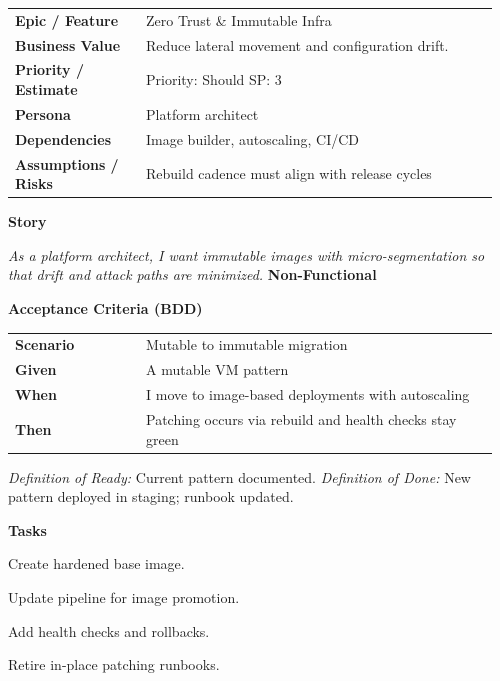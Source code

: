 \documentclass[11pt,letterpaper]{article}
\makeatletter
\newenvironment{kvtable}{%
  \begin{tabular}{@{}>{\bfseries\arraybackslash}p{0.26\linewidth} p{0.70\linewidth}@{}}
}{\end{tabular}}
\newenvironment{bdd}{%
  \begin{tabular}{@{}>{\bfseries\arraybackslash}p{0.26\linewidth} p{0.70\linewidth}@{}}
}{\end{tabular}}
\newcommand{\DoRDoD}[2]{%
  \vspace{0.35em}
  {\footnotesize\color{Muted}%
    \textit{Definition of Ready:} #1 \; \textbullet\;
    \textit{Definition of Done:} #2%
  }%
}
\newenvironment{storycard}[2]{%
  \begin{tcolorbox}[cloudcard, title={#1 --- #2}]%
}{\end{tcolorbox}}
\newcommand{\sectionlabel}[1]{\vspace{0.35em}\textbf{#1}\par}
\makeatother
\begin{document}
\begin{storycard}{CCS-15}{Ch. 15 — Architecture \& Security Concepts}
\begin{kvtable}
Epic / Feature & Zero Trust \& Immutable Infra\\
Business Value & Reduce lateral movement and configuration drift.\\
Priority / Estimate & Priority: Should \quad SP: 3\\
Persona & Platform architect\\
Dependencies & Image builder, autoscaling, CI/CD\\
Assumptions / Risks & Rebuild cadence must align with release cycles\\
\end{kvtable}
\sectionlabel{Story}
\textit{As a platform architect, I want immutable images with micro-segmentation so that drift and attack paths are minimized.}
\sectionlabel{Non-Functional}\;
\sectionlabel{Acceptance Criteria (BDD)}
\begin{bdd}
Scenario & Mutable to immutable migration\\
Given & A mutable VM pattern\\
When & I move to image-based deployments with autoscaling\\
Then & Patching occurs via rebuild and health checks stay green\\
\end{bdd}
\DoRDoD{Current pattern documented.}{New pattern deployed in staging; runbook updated.}
\sectionlabel{Tasks}
\begin{checklist}
\item Create hardened base image.
\item Update pipeline for image promotion.
\item Add health checks and rollbacks.
\item Retire in-place patching runbooks.
\end{checklist}
\end{storycard}
\end{document}
